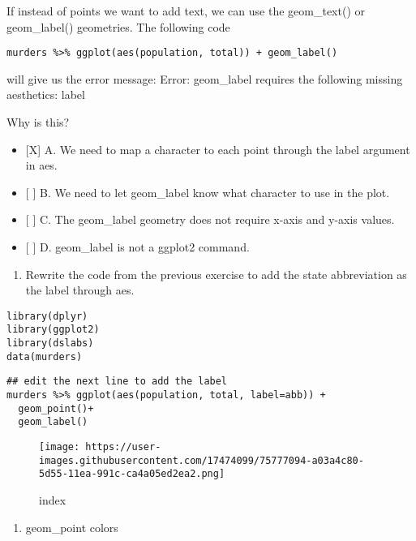 \documentclass[]{article}
\providecommand{\tightlist}{%
  \setlength{\itemsep}{0pt}\setlength{\parskip}{0pt}}
\begin{document}
If instead of points we want to add text, we can use the geom\_text() or
geom\_label() geometries. The following code

\begin{verbatim}
murders %>% ggplot(aes(population, total)) + geom_label()
\end{verbatim}

will give us the error message: Error: geom\_label requires the
following missing aesthetics: label

Why is this?

\begin{itemize}
\tightlist
\item
  {[}X{]} A. We need to map a character to each point through the label
  argument in aes.
\item
  {[} {]} B. We need to let geom\_label know what character to use in
  the plot.
\item
  {[} {]} C. The geom\_label geometry does not require x-axis and y-axis
  values.
\item
  {[} {]} D. geom\_label is not a ggplot2 command.
\end{itemize}

\begin{enumerate}
\def\labelenumi{\arabic{enumi}.}
\setcounter{enumi}{7}
\tightlist
\item
  Rewrite the code from the previous exercise to add the state
  abbreviation as the label through aes.
\end{enumerate}

\begin{verbatim}
library(dplyr)
library(ggplot2)
library(dslabs)
data(murders)
\end{verbatim}

\begin{verbatim}
## edit the next line to add the label
murders %>% ggplot(aes(population, total, label=abb)) +
  geom_point()+
  geom_label()
\end{verbatim}

\begin{figure}
\centering
\texttt{[image: https://user-images.githubusercontent.com/17474099/75777094-a03a4c80-5d55-11ea-991c-ca4a05ed2ea2.png]}
\caption{index}
\end{figure}

\begin{enumerate}
\def\labelenumi{\arabic{enumi}.}
\setcounter{enumi}{8}
\tightlist
\item
  geom\_point colors
\end{enumerate}
\end{document}
